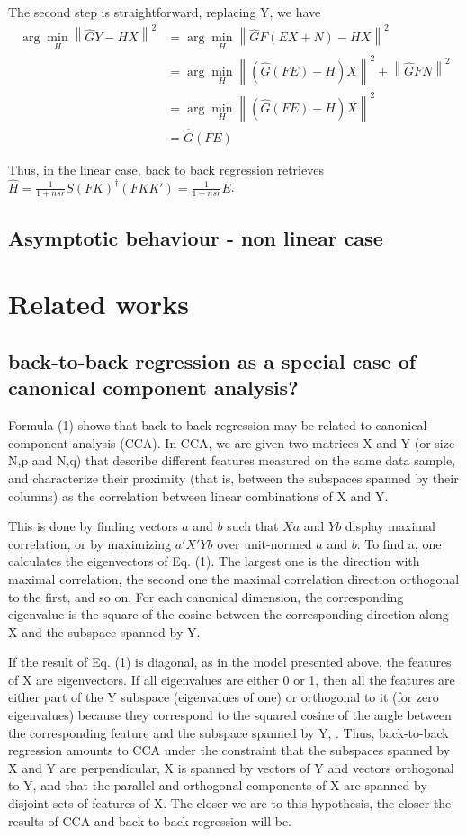 \documentclass{article}
\begin{document}
The second step is straightforward, replacing Y, we have
\begin{equation}
\begin{aligned}
\arg \min_H \left \| \hat GY - HX \right \|^2 &=\arg  \min_H \left \| \hat GF(EX+N) - HX \right \|^2 \\
&=\arg \min_H \left \| (\hat G(FE)-H)X \right \| ^2 + \left \| \hat GFN \right \| ^2\\
&= \arg \min_H \left \| (\hat G(FE)-H)X \right \| ^2\\
&=\hat G (FE)
\end{aligned}
\end{equation}

Thus, in the linear case, back to back regression retrieves $\hat H = \frac{1}{1+nsr} S (FK)^{\dagger}(FKK') = \frac{1}{1+nsr} E$.

\subsection{Asymptotic behaviour - non linear case}

\section{Related works}
\subsection{back-to-back regression as a special case of canonical component analysis?}
Formula (1) shows that back-to-back regression may be related to canonical component analysis (CCA).
%
In CCA, we are given two matrices X and Y (or size N,p and N,q) that describe different features measured on the same data sample, and characterize their proximity (that is, between the subspaces spanned by their columns) as the correlation between linear combinations of X and Y.

This is done by finding vectors $a$ and $b$ such that $Xa$ and $Yb$ display maximal correlation, or by maximizing $a'X'Yb$ over unit-normed $a$ and $b$.
%
To find a, one calculates the eigenvectors of Eq. (1).
%
The largest one is the direction with maximal correlation, the second one the maximal correlation direction orthogonal to the first, and so on.
%
For each canonical dimension, the corresponding eigenvalue is the square of the cosine between the corresponding direction along X and the subspace spanned by Y.

If the result of Eq. (1) is diagonal, as in the model presented above, the features of X are eigenvectors.
%
If all eigenvalues are either 0 or 1, then all the features are either part of the Y subspace (eigenvalues of one) or orthogonal to it (for zero eigenvalues) because they correspond to the squared cosine of the angle between the corresponding feature and the subspace spanned by Y, .
%
Thus, back-to-back regression amounts to CCA under the constraint that the subspaces spanned by X and Y are perpendicular, X is spanned by vectors of Y and vectors orthogonal to Y, and that the parallel and orthogonal components of X are spanned by disjoint sets of features of X.
%
The closer we are to this hypothesis, the closer the results of CCA and back-to-back regression will be.
\end{document}
